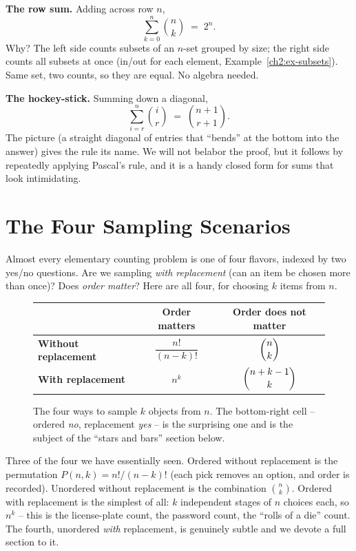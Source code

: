 \textbf{The row sum.} Adding across row $n$,
\[
  \sum_{k=0}^{n} \binom{n}{k} \;=\; 2^n.
\]
Why? The left side counts subsets of an $n$-set grouped by size; the right side counts all
subsets at once (in/out for each element, Example~\ref{ch2:ex-subsets}). Same set, two
counts, so they are equal. No algebra needed.

\textbf{The hockey-stick.} Summing down a diagonal,
\[
  \sum_{i=r}^{n} \binom{i}{r} \;=\; \binom{n+1}{r+1}.
\]
The picture (a straight diagonal of entries that ``bends'' at the bottom into the answer)
gives the rule its name. We will not belabor the proof, but it follows by repeatedly
applying Pascal's rule, and it is a handy closed form for sums that look intimidating.

\section{The Four Sampling Scenarios}
\label{ch2:four}

Almost every elementary counting problem is one of four flavors, indexed by two yes/no
questions. Are we sampling \emph{with replacement} (can an item be chosen more than once)?
Does \emph{order matter}? Here are all four, for choosing $k$ items from $n$.

\begin{figure}[H]
\centering
\renewcommand{\arraystretch}{1.8}
\begin{tabular}{l|c|c}
 & \textbf{Order matters} & \textbf{Order does not matter} \\
\hline
\textbf{Without replacement} & $\dfrac{n!}{(n-k)!}$ & $\dbinom{n}{k}$ \\
\hline
\textbf{With replacement} & $n^k$ & $\dbinom{n+k-1}{k}$ \\
\end{tabular}
\caption{The four ways to sample $k$ objects from $n$. The bottom-right cell -- ordered
\emph{no}, replacement \emph{yes} -- is the surprising one and is the subject of the
``stars and bars'' section below.}
\label{ch2:fig-four}
\end{figure}

Three of the four we have essentially seen. Ordered without replacement is the permutation
$P(n,k) = n!/(n-k)!$ (each pick removes an option, and order is recorded). Unordered without
replacement is the combination $\binom{n}{k}$. Ordered with replacement is the simplest of
all: $k$ independent stages of $n$ choices each, so $n^k$ -- this is the license-plate count,
the password count, the ``rolls of a die'' count. The fourth, unordered \emph{with}
replacement, is genuinely subtle and we devote a full section to it.

